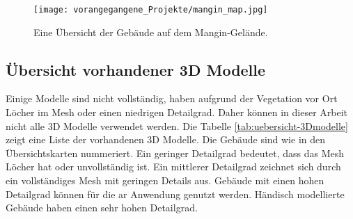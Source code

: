 \begin{figure}[h]
    \centering
    \texttt{[image: vorangegangene\_Projekte/mangin\_map.jpg]}
    \caption{Eine Übersicht der Gebäude auf dem Mangin-Gelände.}
    \label{fig:mangin-map}
\end{figure}
\subsection{Übersicht vorhandener 3D Modelle}
Einige Modelle sind nicht vollständig, haben aufgrund der Vegetation vor Ort Löcher im Mesh oder einen niedrigen Detailgrad. Daher können in dieser Arbeit nicht alle 3D Modelle verwendet werden. Die Tabelle \ref{tab:uebersicht-3Dmodelle} zeigt eine Liste der vorhandenen 3D Modelle. Die Gebäude sind wie in den Übersichtskarten nummeriert. Ein geringer Detailgrad bedeutet, dass das Mesh Löcher hat oder unvollständig ist. Ein mittlerer Detailgrad zeichnet sich durch ein vollständiges Mesh mit geringen Details aus. Gebäude mit einen hohen Detailgrad können für die \Gls{ar} Anwendung genutzt werden. Händisch modellierte Gebäude haben einen sehr hohen Detailgrad.
